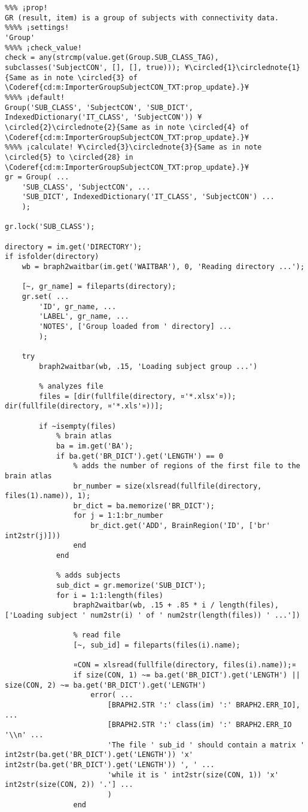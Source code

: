 \documentclass{tufte-handout}
\begin{document}
\begin{lstlisting}
%%% ¡prop!
GR (result, item) is a group of subjects with connectivity data.
%%%% ¡settings!
'Group'
%%%% ¡check_value!
check = any(strcmp(value.get(Group.SUB_CLASS_TAG), subclasses('SubjectCON', [], [], true))); ¥\circled{1}\circlednote{1}{Same as in note \circled{3} of \Coderef{cd:m:ImporterGroupSubjectCON_TXT:prop_update}.}¥
%%%% ¡default!
Group('SUB_CLASS', 'SubjectCON', 'SUB_DICT', IndexedDictionary('IT_CLASS', 'SubjectCON')) ¥\circled{2}\circlednote{2}{Same as in note \circled{4} of \Coderef{cd:m:ImporterGroupSubjectCON_TXT:prop_update}.}¥
%%%% ¡calculate! ¥\circled{3}\circlednote{3}{Same as in note \circled{5} to \circled{28} in \Coderef{cd:m:ImporterGroupSubjectCON_TXT:prop_update}.}¥
gr = Group( ...
    'SUB_CLASS', 'SubjectCON', ...
    'SUB_DICT', IndexedDictionary('IT_CLASS', 'SubjectCON') ...
    );

gr.lock('SUB_CLASS');

directory = im.get('DIRECTORY');
if isfolder(directory)
    wb = braph2waitbar(im.get('WAITBAR'), 0, 'Reading directory ...');
    
    [~, gr_name] = fileparts(directory);
    gr.set( ...
        'ID', gr_name, ...
        'LABEL', gr_name, ...
        'NOTES', ['Group loaded from ' directory] ...
        );

    try
        braph2waitbar(wb, .15, 'Loading subject group ...')
        
        % analyzes file
        files = [dir(fullfile(directory, ¤'*.xlsx'¤)); dir(fullfile(directory, ¤'*.xls'¤))];
        
        if ~isempty(files)
            % brain atlas
            ba = im.get('BA');
            if ba.get('BR_DICT').get('LENGTH') == 0
                % adds the number of regions of the first file to the brain atlas
                br_number = size(xlsread(fullfile(directory, files(1).name)), 1);
                br_dict = ba.memorize('BR_DICT');
                for j = 1:1:br_number
                    br_dict.get('ADD', BrainRegion('ID', ['br' int2str(j)]))
                end
            end

            % adds subjects
            sub_dict = gr.memorize('SUB_DICT');
            for i = 1:1:length(files)
                braph2waitbar(wb, .15 + .85 * i / length(files), ['Loading subject ' num2str(i) ' of ' num2str(length(files)) ' ...'])

                % read file
                [~, sub_id] = fileparts(files(i).name);
                
                ¤CON = xlsread(fullfile(directory, files(i).name));¤
                if size(CON, 1) ~= ba.get('BR_DICT').get('LENGTH') || size(CON, 2) ~= ba.get('BR_DICT').get('LENGTH')
                    error( ...
                        [BRAPH2.STR ':' class(im) ':' BRAPH2.ERR_IO], ...
                        [BRAPH2.STR ':' class(im) ':' BRAPH2.ERR_IO '\\n' ...
                        'The file ' sub_id ' should contain a matrix ' int2str(ba.get('BR_DICT').get('LENGTH')) 'x' int2str(ba.get('BR_DICT').get('LENGTH')) ', ' ...
                        'while it is ' int2str(size(CON, 1)) 'x' int2str(size(CON, 2)) '.'] ...
                        )
                end
                

\end{lstlisting}
\end{document}
